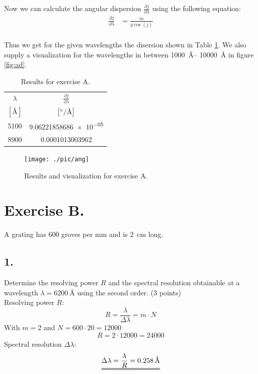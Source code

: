 \documentclass[11pt,a4paper,twoside]{article}
\begin{document}
Now we can calculate the angular dispersion $\frac{\partial j}{\partial\lambda}$ 
using the following equation:
\begin{align}
    \frac{\partial j}{\partial \lambda} &= \frac{m}{g\cos(j)}    \\
\end{align}

Thus we get for the given wavelengths the disersion shown in Table \ref{tab:ad}.
We also supply a visualization for the wavelengths in between \SIrange{1000}{
10000}{\angstrom} in figure \ref{fig:ad}.
\begin{table}[h!]
\centering
\begin{tabular}{cc}\toprule
    $\lambda$   & $\frac{\partial j}{\partial \lambda}$  \\
    $\left[\si{\angstrom}\right]$ 
                & $\left[\si[per-mode=symbol]{\degree\per\angstrom}\right]$ \\
    \midrule
    5100        &   \num[round-mode=places, round-precision=4]{9.06221858686e-05} \\
    8900        &   \num[round-mode=places, round-precision=4]{0.0001013003962}   \\
\bottomrule
\end{tabular}
\caption{Results for exercise A.}
\label{tab:ad}
\end{table}

\begin{figure}
\centering
\texttt{[image: ./pic/ang]}
\caption{Results and visualization for exercise A.}
\end{figure}

\section*{Exercise B.}
A grating has \num{600} groves per \si{mm} and is \SI{2}{\cm} long.\\

\subsection*{1.} Determine the resolving power $R$ and the spectral resolution obtainable at a wavelength 
$\lambda = \SI{6200}{\angstrom}$ using the second order. (3 points)\\

Resolving power $R$:\\
\begin{equation}
R=\frac{\lambda}{\Delta\lambda}=m\cdot N
\end{equation}
With $m=2$ and $N=\num{600} \cdot \num{20} =\num{12000}$
\begin{equation}
\underline{R=2\cdot \num{12000}=\num{24000}}
\end{equation}
Spectral resolution $\Delta\lambda$:
\begin{equation}
\uuline{\Delta\lambda=\frac{\lambda}{R} = \SI{0.258}{\angstrom}}
\end{equation}
\end{document}
